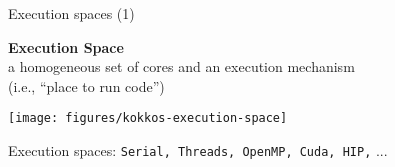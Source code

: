 \begin{frame}{Execution spaces (1)}

  \vspace{-15pt}

  \begin{center}
  \textbf{Execution Space} \\
  a homogeneous set of cores and an execution mechanism \\
  (i.e., ``place to run code'')
  \end{center}

  \vspace{-15pt}

  \begin{center}
    \texttt{[image: figures/kokkos-execution-space]}
  \end{center}

  \vspace{-12pt}

  {Execution spaces: \texttt{Serial, Threads, OpenMP, Cuda, HIP,} ... }

\end{frame}


